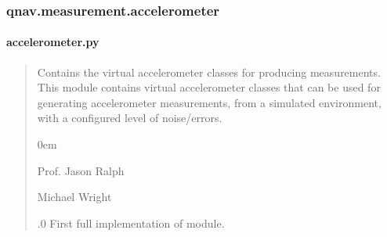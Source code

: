 \documentclass[letterpaper,10pt,english]{sphinxmanual}
\begin{document}
\sphinxstepscope


\subsubsection{qnav.measurement.accelerometer}
\label{\detokenize{modules/measurement/accelerometer:module-qnav.measurement.accelerometer}}\label{\detokenize{modules/measurement/accelerometer:qnav-measurement-accelerometer}}\label{\detokenize{modules/measurement/accelerometer::doc}}

\paragraph{accelerometer.py}
\label{\detokenize{modules/measurement/accelerometer:accelerometer-py}}\begin{quote}\begin{description}
\sphinxAtStartPar
Contains the virtual accelerometer classes for producing measurements.
This module contains virtual accelerometer classes that can be used for
generating accelerometer measurements, from a simulated environment,
with a configured level of noise/errors.

\begin{DUlineblock}{0em}
\item[] Prof. Jason Ralph \sphinxhyphen{} 
\item[] Michael Wright \sphinxhyphen{} 
\end{DUlineblock}

.0 \sphinxhyphen{} First full implementation of module.

\end{description}\end{quote}
\end{document}
